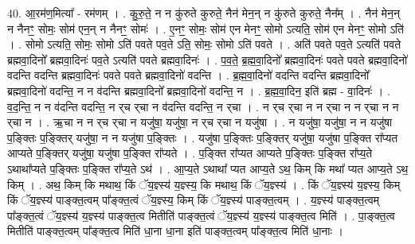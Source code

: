 \documentclass[17pt]{extarticle}
\begin{document}
40. आ॒रम॑ण॒मित्या᳚ - रम॑णम् । . कु॒रु॒ते॒ न न कु॑रुते कुरुते॒ नैन॑ मेन॒न् न कु॑रुते कुरुते॒ नैन᳚म् । . नैन॑ मेन॒न् न नैनꣳ॒॒ सोमः॒ सोम॑ एन॒न् न नैनꣳ॒॒ सोमः॑ । . ए॒नꣳ॒॒ सोमः॒ सोम॑ एन मेनꣳ॒॒ सोमो ऽत्यति॒ सोम॑ एन मेनꣳ॒॒ सोमो ऽति॑ । . सोमो ऽत्यति॒ सोमः॒ सोमो ऽति॑ पवते पव॒ते ऽति॒ सोमः॒ सोमो ऽति॑ पवते । . अति॑ पवते पव॒ते ऽत्यति॑ पवते ब्रह्मवा॒दिनो᳚ ब्रह्मवा॒दिनः॑ पव॒ते ऽत्यति॑ पवते ब्रह्मवा॒दिनः॑ । . प॒व॒ते॒ ब्र॒ह्म॒वा॒दिनो᳚ ब्रह्मवा॒दिनः॑ पवते पवते ब्रह्मवा॒दिनो॑ वदन्ति वदन्ति ब्रह्मवा॒दिनः॑ पवते पवते ब्रह्मवा॒दिनो॑ वदन्ति । . ब्र॒ह्म॒वा॒दिनो॑ वदन्ति वदन्ति ब्रह्मवा॒दिनो᳚ ब्रह्मवा॒दिनो॑ वदन्ति॒ न न व॑दन्ति ब्रह्मवा॒दिनो᳚ ब्रह्मवा॒दिनो॑ वदन्ति॒ न । . ब्र॒ह्म॒वा॒दिन॒ इति॑ ब्रह्म - वा॒दिनः॑ । . व॒द॒न्ति॒ न न व॑दन्ति वदन्ति॒ न र्‌च र्‌चा न व॑दन्ति वदन्ति॒ न र्‌चा । . न र्‌च र्‌चा न न र्‌चा न न र्‌चा न न र्‌चा न । . ऋ॒चा न न र्‌च र्‌चा न यजु॑षा॒ यजु॑षा॒ न र्‌च र्‌चा न यजु॑षा । . न यजु॑षा॒ यजु॑षा॒ न न यजु॑षा प॒ङ्क्तिः प॒ङ्क्तिर् यजु॑षा॒ न न यजु॑षा प॒ङ्क्तिः । . यजु॑षा प॒ङ्क्तिः प॒ङ्क्तिर् यजु॑षा॒ यजु॑षा प॒ङ्क्ति रा᳚प्यत आप्यते प॒ङ्क्तिर् यजु॑षा॒ यजु॑षा प॒ङ्क्ति रा᳚प्यते । . प॒ङ्क्ति रा᳚प्यत आप्यते प॒ङ्क्तिः प॒ङ्क्ति रा᳚प्य॒ते ऽथाथा᳚प्यते प॒ङ्क्तिः प॒ङ्क्ति रा᳚प्य॒ते ऽथ॑ । . आ॒प्य॒ते ऽथाथा᳚ प्यत आप्य॒ते ऽथ॒ किम् कि मथा᳚ प्यत आप्य॒ते ऽथ॒ किम् । . अथ॒ किम् कि मथाथ॒ किं ॅय॒ज्ञ्स्य॑ य॒ज्ञ्स्य॒ कि मथाथ॒ किं ॅय॒ज्ञ्स्य॑ । . किं ॅय॒ज्ञ्स्य॑ य॒ज्ञ्स्य॒ किम् किं ॅय॒ज्ञ्स्य॑ पाङ्क्त॒त्वम् पा᳚ङ्क्त॒त्वं ॅय॒ज्ञ्स्य॒ किम् किं ॅय॒ज्ञ्स्य॑ पाङ्क्त॒त्वम् । . य॒ज्ञ्स्य॑ पाङ्क्त॒त्वम् पा᳚ङ्क्त॒त्वं ॅय॒ज्ञ्स्य॑ य॒ज्ञ्स्य॑ पाङ्क्त॒त्व मितीति॑ पाङ्क्त॒त्वं ॅय॒ज्ञ्स्य॑ य॒ज्ञ्स्य॑ पाङ्क्त॒त्व मिति॑ । . पा॒ङ्क्त॒त्व मितीति॑ पाङ्क्त॒त्वम् पा᳚ङ्क्त॒त्व मिति॑ धा॒ना धा॒ना इति॑ पाङ्क्त॒त्वम् पा᳚ङ्क्त॒त्व मिति॑ धा॒नाः । \newline
\end{document}
